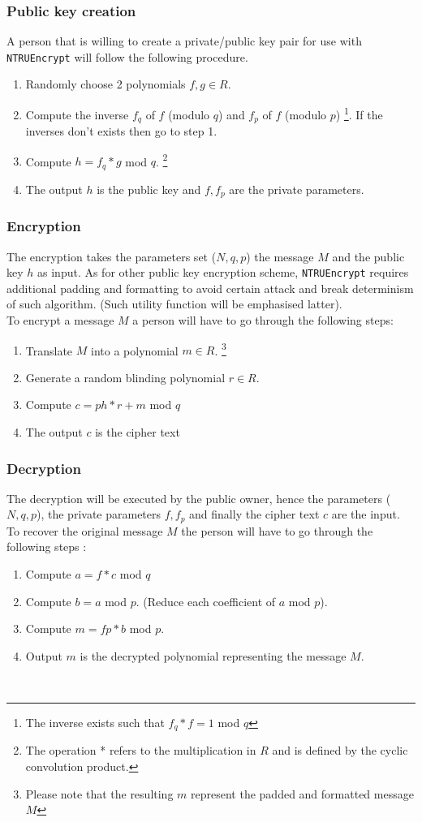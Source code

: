 \subsubsection{Public key creation}
A person that is willing to create a private/public key pair for use with \texttt{NTRUEncrypt} will follow the following procedure.
\begin{enumerate}
	\item Randomly choose 2 polynomials $f,g \in R$. 
	\item Compute the inverse $f_q$ of $f$ (modulo $q$) and $f_p$ of $f$ (modulo $p$) \footnote{The inverse exists such that $f_q * f = 1 $ mod $q$}. If the inverses don't exists then go to step 1.
	\item Compute $h = f_q *g$ mod $q$. \footnote{The operation * refers to the multiplication in $R$ and is defined by the cyclic convolution product.}
	\item The output $h$ is the public key and $f,f_p$ are the private parameters.
\end{enumerate} 
\subsubsection{Encryption}
The encryption takes the parameters set ($N,q,p$) the message $M$ and the public key $h$ as input. As for other public key encryption scheme, \texttt{NTRUEncrypt} requires additional padding and formatting to avoid certain attack and break determinism of such algorithm. (Such utility function will be emphasised latter).\\
To encrypt a message $M$ a person will have to go through the following steps:
\begin{enumerate}
	\item Translate $M$ into a polynomial $m \in R$. \footnote{Please note that the resulting $m$ represent the padded and formatted message $M$}
	\item Generate a random blinding polynomial $r \in R$.
	\item Compute $c=ph*r+m$ mod $q$
	\item The output $c$ is the cipher text
\end{enumerate}

\subsubsection{Decryption}
The decryption will be executed by the public owner, hence the parameters ($N,q,p$), the private parameters $f,f_p$ and finally the cipher text $c$ are the input.\\
To recover the original message $M$ the person will have to go through the following steps :
\begin{enumerate}
	\item Compute $a=f*c$ mod $q$
	\item Compute $b=a$ mod $p$. (Reduce each coefficient of $a$ mod $p$).
	\item Compute $m=fp*b$ mod $p$.
	\item Output $m$ is the decrypted polynomial representing the message $M$.
\end{enumerate}
\\

